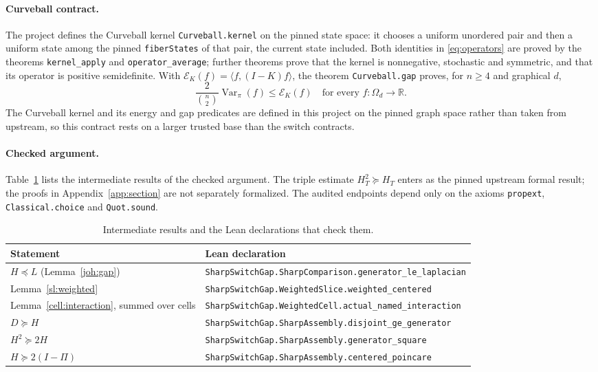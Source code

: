 \paragraph{Curveball contract.}
The project defines the Curveball kernel \texttt{Curveball.kernel} on the
pinned state space: it chooses a uniform unordered pair and then a
uniform state among the pinned \texttt{fiberStates} of that pair, the current
state included. Both identities in \eqref{eq:operators} are proved by the
theorems \texttt{kernel\_apply} and \texttt{operator\_average};
further theorems prove that the kernel is nonnegative, stochastic and
symmetric, and that its operator is positive semidefinite. With
$\mathcal E_K(f)=\langle f,(I-K)f\rangle$, the theorem \texttt{Curveball.gap}
proves, for $n\ge4$ and graphical $d$,
\[
 \frac{2}{\binom n2}\operatorname{Var}_\pi(f)\le\mathcal E_K(f)
 \quad\text{for every }f\colon\Omega_d\to\mathbb R.
\]
The Curveball kernel and its energy and gap predicates are defined in this
project on the pinned graph space rather than taken from upstream, so this
contract rests on a larger trusted base than the switch contracts.

\paragraph{Checked argument.}
Table~\ref{fv:declarations} lists the intermediate results of the checked
argument. The triple estimate $H_T^2\succeq H_T$ enters as the pinned
upstream formal result; the proofs in Appendix~\ref{app:section} are not
separately formalized. The audited endpoints depend only on the axioms
\texttt{propext}, \texttt{Classical.choice} and \texttt{Quot.sound}.

\begin{table}[ht]
\centering
\small
\begin{tabular}{ll}
\toprule
Statement & Lean declaration\\
\midrule
$H\preceq L$ (Lemma~\ref{joh:gap}) &
\texttt{SharpSwitchGap.SharpComparison.generator\_le\_laplacian}\\
Lemma~\ref{sl:weighted} &
\texttt{SharpSwitchGap.WeightedSlice.weighted\_centered}\\
Lemma~\ref{cell:interaction}, summed over cells &
\texttt{SharpSwitchGap.WeightedCell.actual\_named\_interaction}\\
$D\succeq H$ &
\texttt{SharpSwitchGap.SharpAssembly.disjoint\_ge\_generator}\\
$H^2\succeq2H$ &
\texttt{SharpSwitchGap.SharpAssembly.generator\_square}\\
$H\succeq2(I-\Pi)$ &
\texttt{SharpSwitchGap.SharpAssembly.centered\_poincare}\\
\bottomrule
\end{tabular}
\caption{Intermediate results and the Lean declarations that check them.}
\label{fv:declarations}
\end{table}

